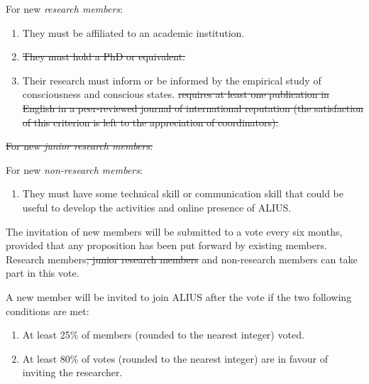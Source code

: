 \documentclass[a4paper, 11pt]{scrartcl}
\begin{document}
For new \emph{research members}:

\begin{enumerate}
\item They must be affiliated to an academic institution. 
\item \sout{They must hold a PhD or equivalent.}
\item Their research must inform or be informed by the empirical study of consciousness and conscious states. \sout{\This requires at least one publication in English in a peer-reviewed journal of international reputation (the satisfaction of this criterion is left to the appreciation of coordinators).}

\end{enumerate}

\sout{For new \emph{junior research members}:}


For new \emph{non-research members}:   

\begin{enumerate}

\item They must have some technical skill or communication skill that could be useful to develop the activities and online presence of ALIUS.

\end{enumerate}

\noindent The invitation of new members will be submitted to a vote every six months, provided that any proposition has been put forward by existing members. Research members\sout{, junior research members} and non-research members can take part in this vote.

A new member will be invited to join ALIUS after the vote if the two following conditions are met:

\begin{enumerate}
\item At least 25\% of members (rounded to the nearest integer) voted.
\item At least 80\% of votes (rounded to the nearest integer) are in favour of inviting the researcher.
\end{enumerate}
\end{document}
